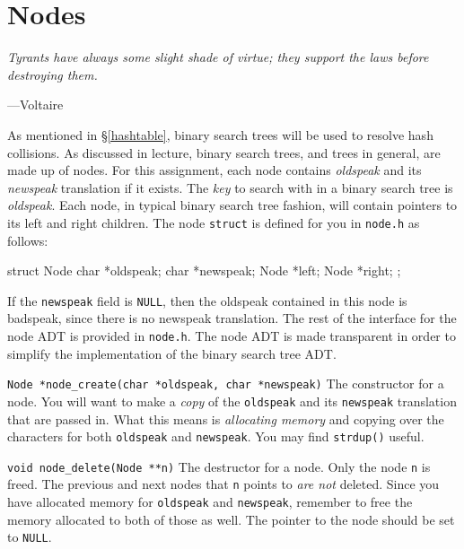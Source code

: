 \section{Nodes}
\epigraph{\emph{Tyrants have always some slight shade of virtue; they support the laws before destroying them.}}{---Voltaire}

\noindent
As mentioned in \S\ref{hashtable}, binary search trees will be used to
resolve hash collisions. As discussed in lecture, binary search trees,
and trees in general, are made up of nodes. For this assignment, each
node contains \emph{oldspeak} and its \emph{newspeak} translation if it
exists. The \emph{key} to search with in a binary search tree is
\emph{oldspeak}. Each node, in typical binary search tree fashion, will
contain pointers to its left and right children. The node
\texttt{struct} is defined for you in \texttt{node.h} as follows:

\begin{clisting}{}
struct Node {
    char *oldspeak;
    char *newspeak;
    Node *left;
    Node *right;
};
\end{clisting}

If the \texttt{newspeak} field is \texttt{NULL}, then the oldspeak
contained in this node is badspeak, since there is no newspeak
translation. The rest of the interface for the node ADT is provided in
\texttt{node.h}. The node ADT is made transparent in order to simplify
the implementation of the binary search tree ADT.

\begin{funcdoc}{\texttt{Node *node\_create(char *oldspeak, char *newspeak)}}
  The constructor for a node. You will want to make a \emph{copy} of the
  \texttt{oldspeak} and its \texttt{newspeak} translation that are passed
  in. What this means is \emph{allocating memory} and copying over the
  characters for both \texttt{oldspeak} and \texttt{newspeak}. You may
  find \texttt{strdup()} useful.
\end{funcdoc}

\begin{funcdoc}{\texttt{void node\_delete(Node **n)}}
  The destructor for a node. Only the node \texttt{n} is freed. The
  previous and next nodes that \texttt{n} points to \emph{are not}
  deleted. Since you have allocated memory for \texttt{oldspeak} and
  \texttt{newspeak}, remember to free the memory allocated to both of
  those as well. The pointer to the node should be set to \texttt{NULL}.
\end{funcdoc}

